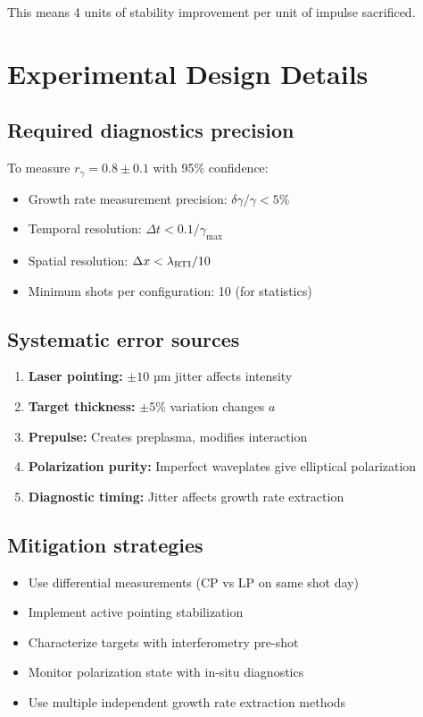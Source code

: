 \documentclass[aps,pre,twocolumn,showpacs,superscriptaddress]{revtex4-2}
\theoremstyle{definition}
\begin{document}
This means 4 units of stability improvement per unit of impulse sacrificed.

\section{Experimental Design Details}

\subsection{Required diagnostics precision}

To measure $r_\gamma = 0.8 \pm 0.1$ with 95\% confidence:
\begin{itemize}
\item Growth rate measurement precision: $\delta\gamma/\gamma < 5\%$
\item Temporal resolution: $\Delta t < 0.1/\gamma_{\max}$
\item Spatial resolution: $\Delta x < \lambda_{\rm RTI}/10$
\item Minimum shots per configuration: 10 (for statistics)
\end{itemize}

\subsection{Systematic error sources}

\begin{enumerate}
\item \textbf{Laser pointing:} $\pm 10$ µm jitter affects intensity
\item \textbf{Target thickness:} $\pm 5\%$ variation changes $a$
\item \textbf{Prepulse:} Creates preplasma, modifies interaction
\item \textbf{Polarization purity:} Imperfect waveplates give elliptical polarization
\item \textbf{Diagnostic timing:} Jitter affects growth rate extraction
\end{enumerate}

\subsection{Mitigation strategies}

\begin{itemize}
\item Use differential measurements (CP vs LP on same shot day)
\item Implement active pointing stabilization
\item Characterize targets with interferometry pre-shot
\item Monitor polarization state with in-situ diagnostics
\item Use multiple independent growth rate extraction methods
\end{itemize}


\end{document}
